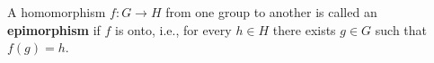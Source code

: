 A homomorphism $f \colon G \to H$ from one group to another is called an \textbf{epimorphism} if $f$ is onto, i.e., for every $h \in H$ there exists $g \in G$ such that $f(g) = h$.
